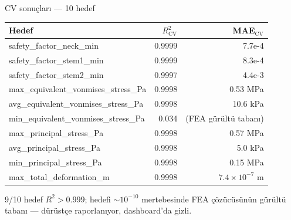 \begin{frame}{CV sonuçları --- 10 hedef}
  \begin{center}\footnotesize
    \begin{tabular}{lrr}
      \toprule
      Hedef & \(R^2_{\text{CV}}\) & MAE\(_{\text{CV}}\) \\
      \midrule
      safety\_factor\_neck\_min            & 0.9999 & 7.7e-4 \\
      safety\_factor\_stem1\_min           & 0.9999 & 8.3e-4 \\
      safety\_factor\_stem2\_min           & 0.9997 & 4.4e-3 \\
      max\_equivalent\_vonmises\_stress\_Pa & 0.9998 & 0.53 MPa \\
      avg\_equivalent\_vonmises\_stress\_Pa & 0.9998 & 10.6 kPa \\
      \alert{min\_equivalent\_vonmises\_stress\_Pa} & \alert{0.034} & \alert{(FEA gürültü tabanı)} \\
      max\_principal\_stress\_Pa            & 0.9998 & 0.57 MPa \\
      avg\_principal\_stress\_Pa            & 0.9998 & 5.0 kPa \\
      min\_principal\_stress\_Pa            & 0.9998 & 0.15 MPa \\
      max\_total\_deformation\_m            & 0.9998 & \(7.4 \times 10^{-7}\) m \\
      \bottomrule
    \end{tabular}
  \end{center}

  \vspace{0.4cm}
  9/10 hedef \(R^2 > 0.999\);  hedefi \(\sim 10^{-10}\)
  mertebesinde FEA çözücüsünün gürültü tabanı --- dürüstçe raporlanıyor,
  dashboard'da gizli.
\end{frame}

